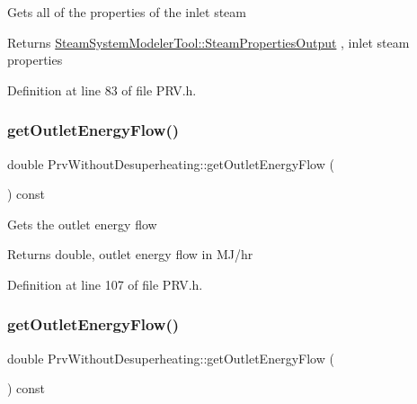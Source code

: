 Gets all of the properties of the inlet steam \begin{DoxyReturn}{Returns}
\hyperlink{struct_steam_system_modeler_tool_1_1_steam_properties_output}{Steam\+System\+Modeler\+Tool\+::\+Steam\+Properties\+Output} , inlet steam properties 
\end{DoxyReturn}


Definition at line 83 of file P\+R\+V.\+h.

\mbox{\label{class_prv_without_desuperheating_ab13245e86b90832de0b4190163236551}} 
\subsubsection{\texorpdfstring{get\+Outlet\+Energy\+Flow()}{getOutletEnergyFlow()}\hspace{0.1cm}{\footnotesize\ttfamily [1/3]}}
{\footnotesize\ttfamily double Prv\+Without\+Desuperheating\+::get\+Outlet\+Energy\+Flow (\begin{DoxyParamCaption}{ }\end{DoxyParamCaption}) const\hspace{0.3cm}{\ttfamily [inline]}}

Gets the outlet energy flow \begin{DoxyReturn}{Returns}
double, outlet energy flow in M\+J/hr 
\end{DoxyReturn}


Definition at line 107 of file P\+R\+V.\+h.

\mbox{\label{class_prv_without_desuperheating_ab13245e86b90832de0b4190163236551}} 
\subsubsection{\texorpdfstring{get\+Outlet\+Energy\+Flow()}{getOutletEnergyFlow()}\hspace{0.1cm}{\footnotesize\ttfamily [2/3]}}
{\footnotesize\ttfamily double Prv\+Without\+Desuperheating\+::get\+Outlet\+Energy\+Flow (\begin{DoxyParamCaption}{ }\end{DoxyParamCaption}) const\hspace{0.3cm}{\ttfamily [inline]}}

